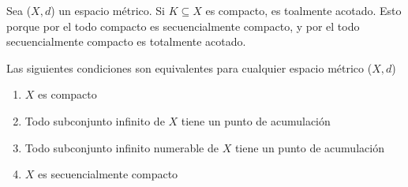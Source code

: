 \begin{corollary}
    Sea ($X,d$) un espacio métrico. Si $K \subseteq X$ es compacto, es toalmente acotado. Esto porque por el  todo compacto es secuencialmente compacto, y por el  todo secuencialmente compacto es totalmente acotado.
\end{corollary}

\begin{theorem} \label{theombw}
    Las siguientes condiciones son equivalentes para cualquier espacio métrico ($X,d$)

    \begin{enumerate}
        \item $X$ es compacto
        \item Todo subconjunto infinito de $X$ tiene un punto de acumulación
        \item Todo subconjunto infinito numerable de $X$ tiene un punto de acumulación
        \item $X$ es secuencialmente compacto
    \end{enumerate}
\end{theorem}

